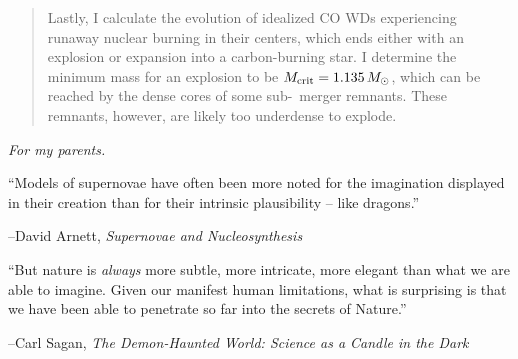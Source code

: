 \documentclass{ut-thesis}
\begin{document}
\begin{preliminary}
\begin{abstract}
Lastly, I calculate the evolution of idealized CO WDs experiencing runaway nuclear burning in their centers, which ends either with an explosion or expansion into a carbon-burning star.  I determine the minimum mass for an explosion to be $\Mcrit = 1.135\,\Msun$, which can be reached by the dense cores of some sub-\Mch\ merger remnants.  These remnants, however, are likely too underdense to explode.

\end{abstract}


\vspace*{\fill}
\begin{center}
\begin{minipage}[c]{3.75in}
\begin{center}
\textit{For my parents.}
\end{center}
\end{minipage}
\end{center}
\vspace*{\fill}
\clearpage

\vspace*{\fill}
\begin{center}
\begin{minipage}[c]{4.75in}
``Models of supernovae have often been more noted for the imagination displayed in their creation than for their intrinsic plausibility -- like dragons.''\vspace{2em}

\hfill --David Arnett, \emph{Supernovae and Nucleosynthesis}\vspace{4em}

``But nature is \textit{always} more subtle, more intricate, more elegant than what we are able to imagine.  Given our manifest human limitations, what is surprising is that we have been able to penetrate so far into the secrets of Nature.''\vspace{2em}

\hfill --Carl Sagan, \emph{The Demon-Haunted World: Science as a Candle in the Dark}

\end{minipage}
\end{center}
\vspace*{\fill}


\end{preliminary}
\end{document}
